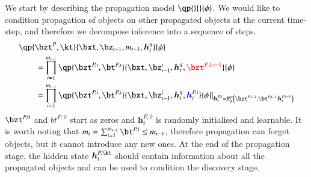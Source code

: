 We start by describing the propagation model $\qp{}{}{\phi}$. We would like to condition propagation of objects on other propagated objects at the current time-step, and therefore we decompose inference into a sequence of steps.
\begin{equation}
\begin{aligned}
    &\qp{\bzt^P, \kt}{\bxt, \bz_{t-1}, m_{t-1}, \bm{h}_t^q}{\phi}\\
%    
    &\qquad= \prod_{i=1}^{m_{t-1}} \qp{\bzt^{P, i}, \bt^{P, i}}{\bxt, \bz_{t-1}^i, \bm{h}_t^q, \textcolor{red}{\bzt^{P, 1:i-1}}}{\phi}\\
%    
    &\qquad= \prod_{i=1}^{m_{t-1}} \qp{\bzt^{P, i}, \bt^{P, i}}{\bxt, \bz_{t-1}^i, \bm{h}_t^q, \textcolor{blue}{\bm{h}_t^{P, i}}}{\phi} \lvert_{\bm{h}_t^{P, i} = R_\phi^P \left(  \bzt^{P, i-1}, \bt^{P, i-1} \bm{h}_t^{P, i-1} \right)}
\end{aligned}
\end{equation}
$\bzt^{P, 0}$ and $bt^{P, 0}$ start as zeros and  $\bm{h}_t^{P, 0}$ is randomly initialised and learnable. It is worth noting that $m_t = \sum_{i=1}^{m_{t-1}} \bt^{P,i} \leq m_{t-1}$, therefore propagation can forget objects, but it cannot introduce any new ones. At the end of the propagation stage, the hidden state $\bm{h}_t^{P, \kt}$ should contain information about all the propagated objects and can be used to condition the discovery stage.

